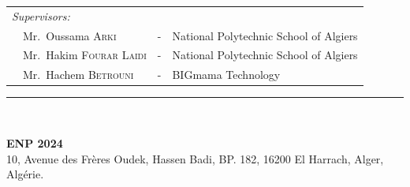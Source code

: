 {\begin{titlepage}
\begin{center}
\begin{tabular}{llcl}
            \\
            \textit{Supervisors:}                                  &   &                                        & \\
            \multicolumn{2}{l}{~~Mr.\ Oussama \textsc{Arki}}       & - & National Polytechnic School of Algiers   \\
            \multicolumn{2}{l}{~~Mr.\ Hakim \textsc{Fourar Laidi}} & - & National Polytechnic School of Algiers   \\
            \multicolumn{2}{l}{~~Mr.\ Hachem \textsc{Betrouni}}    & - & BIGmama Technology                       \\
        \end{tabular}
    \end{center}

    \vspace*{12mm}

    \rule{\linewidth}{1pt} \\[5mm]
    \begin{center}
        \textbf{ENP 2024} \\
        10, Avenue des Frères Oudek, Hassen Badi, BP. 182, 16200 El Harrach, Alger, Algérie.
    \end{center}

\end{titlepage}
}